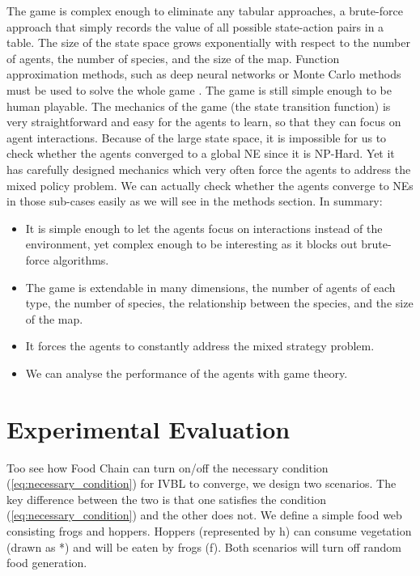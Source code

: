\documentclass[]{interact}
\theoremstyle{plain}%
\theoremstyle{definition}
\theoremstyle{remark}
\begin{document}
The game is complex enough to eliminate any tabular approaches, a brute-force approach that simply records the value of all possible state-action pairs in a table. The size of the state space grows exponentially with respect to the number of agents, the number of species, and the size of the map. Function approximation methods, such as deep neural networks or Monte Carlo methods must be used to solve the whole game \cite{silver2016mastering}. The game is still simple enough to be human playable. The mechanics of the game (the state transition function) is very straightforward and easy for the agents to learn, so that they can focus on agent interactions. Because of the large state space, it is impossible for us to check whether the agents converged to a global NE since it is NP-Hard. Yet it has carefully designed mechanics which very often force the agents to address the mixed policy problem. We can actually check whether the agents converge to NEs in those sub-cases easily as we will see in the methods section. In summary:
\begin{itemize}
    \item It is simple enough to let the agents focus on interactions instead of the environment, yet complex enough to be interesting as it blocks out brute-force algorithms.
    \item The game is extendable in many dimensions, the number of agents of each type, the number of species, the relationship between the species, and the size of the map.
    \item It forces the agents to constantly address the mixed strategy problem.
    \item We can analyse the performance of the agents with game theory.
\end{itemize}

\section{Experimental Evaluation}
Too see how Food Chain can turn on/off the necessary condition (\ref{eq:necessary_condition}) for IVBL to converge, we design two scenarios. The key difference between the two is that one satisfies the condition (\ref{eq:necessary_condition}) and the other does not. We define a simple food web consisting frogs and hoppers. Hoppers (represented by h) can consume vegetation (drawn as *) and will be eaten by frogs (f). Both scenarios will turn off random food generation.
\end{document}
